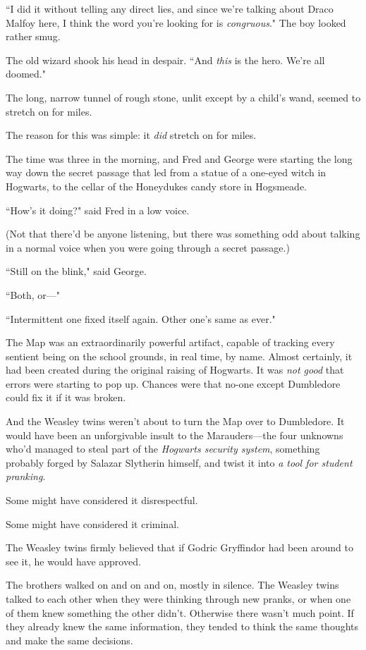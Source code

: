 ``I did it without telling any direct lies, and since we're talking about Draco Malfoy here, I think the word you're looking for is \emph{congruous}." The boy looked rather smug.

The old wizard shook his head in despair. ``And \emph{this} is the hero. We're all doomed."


The long, narrow tunnel of rough stone, unlit except by a child's wand, seemed to stretch on for miles.

The reason for this was simple: it \emph{did} stretch on for miles.

The time was three in the morning, and Fred and George were starting the long way down the secret passage that led from a statue of a one-eyed witch in Hogwarts, to the cellar of the Honeydukes candy store in Hogsmeade.

``How's it doing?" said Fred in a low voice.

(Not that there'd be anyone listening, but there was something odd about talking in a normal voice when you were going through a secret passage.)

``Still on the blink," said George.

``Both, or—"

``Intermittent one fixed itself again. Other one's same as ever."

The Map was an extraordinarily powerful artifact, capable of tracking every sentient being on the school grounds, in real time, by name. Almost certainly, it had been created during the original raising of Hogwarts. It was \emph{not good} that errors were starting to pop up. Chances were that no-one except Dumbledore could fix it if it was broken.

And the Weasley twins weren't about to turn the Map over to Dumbledore. It would have been an unforgivable insult to the Marauders—the four unknowns who'd managed to steal part of the \emph{Hogwarts security system}, something probably forged by Salazar Slytherin himself, and twist it into \emph{a tool for student pranking}.

Some might have considered it disrespectful.

Some might have considered it criminal.

The Weasley twins firmly believed that if Godric Gryffindor had been around to see it, he would have approved.

The brothers walked on and on and on, mostly in silence. The Weasley twins talked to each other when they were thinking through new pranks, or when one of them knew something the other didn't. Otherwise there wasn't much point. If they already knew the same information, they tended to think the same thoughts and make the same decisions.

